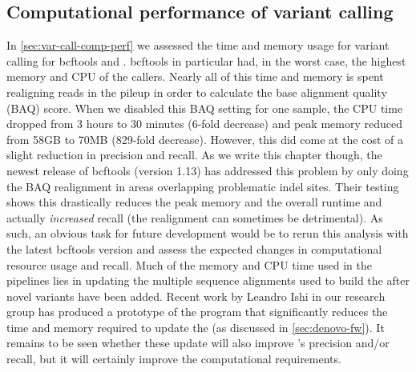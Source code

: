 \subsection{Computational performance of variant calling}
In \autoref{sec:var-call-comp-perf} we assessed the time and memory usage for variant calling for bcftools and \pandora{}. bcftools in particular had, in the worst case, the highest memory and CPU of the callers. Nearly all of this time and memory is spent realigning reads in the pileup in order to calculate the base alignment quality (BAQ) score. When we disabled this BAQ setting for one sample, the CPU time dropped from 3 hours to 30 minutes (6-fold decrease) and peak memory reduced from 58GB to 70MB (829-fold decrease). However, this did come at the cost of a slight reduction in precision and recall. As we write this chapter though, the newest release of bcftools (version 1.13) has addressed this problem by only doing the BAQ realignment in areas overlapping problematic indel sites. Their testing shows this drastically reduces the peak memory and the overall runtime and actually \emph{increased} recall (the realignment can sometimes be detrimental). As such, an obvious task for future development would be to rerun this analysis with the latest bcftools version and assess the expected changes in computational resource usage and recall.
Much of the memory and CPU time used in the \pandora{} pipelines lies in updating the multiple sequence alignments used to build the \prg{} after novel variants have been added. Recent work by Leandro Ishi in our research group has produced a prototype of the \makeprg{} program that significantly reduces the time and memory required to update the \prg{} (as discussed in \autoref{sec:denovo-fw}). It remains to be seen whether these update will also improve \pandora{}'s precision and/or recall, but it will certainly improve the computational requirements. 


